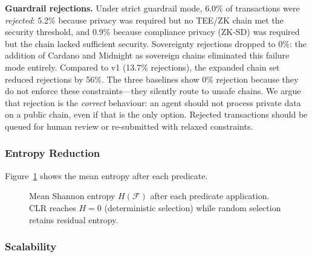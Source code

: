 \documentclass[conference, 10pt, twocolumn]{IEEEtran}
\begin{document}
\textbf{Guardrail rejections.}  Under strict guardrail mode, 6.0\%
of transactions were \emph{rejected}: 5.2\% because privacy was
required but no TEE/ZK chain met the security threshold, and 0.9\%
because compliance privacy (ZK-SD) was required but the chain lacked
sufficient security.  Sovereignty rejections dropped to 0\%: the
addition of Cardano and Midnight as sovereign chains eliminated this
failure mode entirely.  Compared to v1 (13.7\% rejections), the
expanded chain set reduced rejections by 56\%.  The three baselines
show 0\% rejection because they do not enforce these
constraints---they silently route to unsafe chains.  We argue that
rejection is the \emph{correct} behaviour: an agent should not
process private data on a public chain, even if that is the only
option.  Rejected transactions should be queued for human review or
re-submitted with relaxed constraints.

\subsubsection{Entropy Reduction}

Figure~\ref{fig:entropy} shows the mean entropy after each predicate.

\begin{figure}[t]
\centering
{}
\caption{Mean Shannon entropy $H(\mathcal{F})$ after each predicate
application.  CLR reaches $H = 0$ (deterministic selection) while
random selection retains residual entropy.}
\label{fig:entropy}
\end{figure}

\subsubsection{Scalability}
\end{document}
